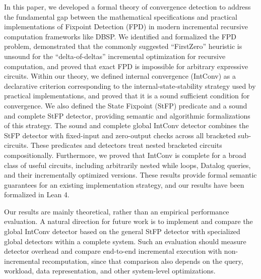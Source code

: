 In this paper, we developed a formal theory of convergence detection to address the fundamental gap between the mathematical specifications and practical implementations of Fixpoint Detection (FPD) in modern incremental recursive computation frameworks like DBSP. We identified and formalized the FPD problem, demonstrated that the commonly suggested ``FirstZero'' heuristic is unsound for the ``delta-of-deltas'' incremental optimization for recursive computation, and proved that exact FPD is impossible for arbitrary expressive circuits. Within our theory, we defined internal convergence (IntConv) as a declarative criterion corresponding to the internal-state-stability strategy used by practical implementations, and proved that it is a sound sufficient condition for convergence. We also defined the State Fixpoint (StFP) predicate and a sound and complete StFP detector, providing semantic and algorithmic formalizations of this strategy. The sound and complete global IntConv detector combines the StFP detector with fixed-input and zero-output checks across all bracketed sub-circuits. These predicates and detectors treat nested bracketed circuits compositionally. Furthermore, we proved that IntConv is complete for a broad class of useful circuits, including arbitrarily nested while loops, Datalog queries, and their incrementally optimized versions. These results provide formal semantic guarantees for an existing implementation strategy, and our results have been formalized in Lean 4.

Our results are mainly theoretical, rather than an empirical performance evaluation. A natural direction for future work is to implement and compare the global IntConv detector based on the general StFP detector with specialized global detectors within a complete system. Such an evaluation should measure detector overhead and compare end-to-end incremental execution with non-incremental recomputation, since that comparison also depends on the query, workload, data representation, and other system-level optimizations.
